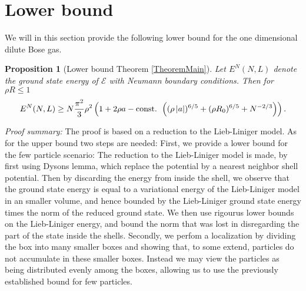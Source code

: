 \documentclass[a4paper,11pt]{article}
\newcommand{\abs}[1]{\left\lvert #1 \right\rvert}
\newtheorem{proposition}[theorem]{Proposition}
\numberwithin{equation}{section}
\begin{document}
	\section{Lower bound}
	We will in this section provide the following lower bound for the one dimensional dilute Bose gas.
	\begin{proposition}[Lower bound Theorem \ref{TheoremMain}]
		\label{PropositionLowerBound} 
		Let $ E^N(N,L) $ denote the ground state energy of $ \mathcal{E} $ with Neumann boundary conditions. Then for $ \rho R \leq 1 $
		\begin{equation}
		E^N(N,L)\geq N\frac{\pi^2}{3}\rho^2\left(1+2\rho a-\textnormal{const. }\left((\rho\abs{a})^{6/5}+(\rho R_0)^{6/5}+N^{-2/3}\right)\right).
		\end{equation}
	\end{proposition}
	\textit{Proof summary:}
	 The proof is based on a reduction to the Lieb-Liniger model. As for the upper bound two steps are needed: First, we provide a lower bound for the few particle scenario: The reduction to the Lieb-Liniger model is made, by first using Dysons lemma, which replace the potential by a nearest neighbor shell potential. Then by discarding the energy from inside the shell, we observe that the ground state energy is equal to a variational energy of the Lieb-Liniger model in an smaller volume, and hence bounded by the Lieb-Liniger ground state energy times the norm of the reduced ground state. We then use rigourus lower bounds on the Lieb-Liniger energy, and bound the norm that was lost in disregarding the part of the state inside the shells.
	 Secondly, we perfom a localization by dividing the box into many smaller boxes and showing that, to some extend, particles do not accumulate in these smaller boxes. Instead we may view the particles as being distributed evenly among the boxes, allowing us to use the previously established bound for few particles.
\end{document}
